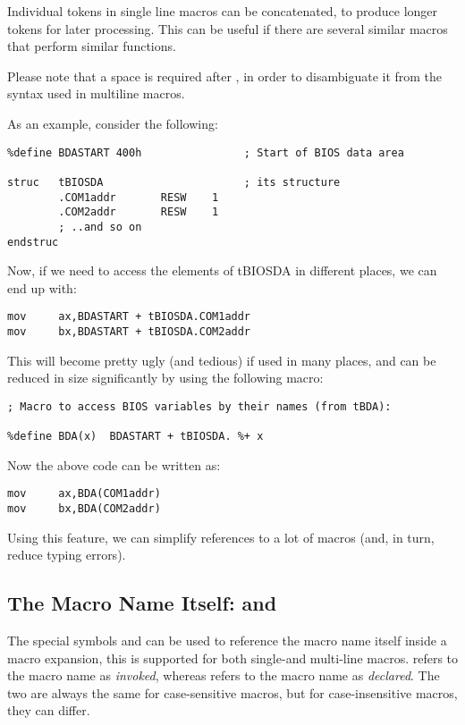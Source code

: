 Individual tokens in single line macros can be concatenated, to produce
longer tokens for later processing. This can be useful if there are
several similar macros that perform similar functions.

Please note that a space is required after \code{\%+}, in order to
disambiguate it from the syntax  used in multiline macros.

As an example, consider the following:

\begin{lstlisting}
%define BDASTART 400h                ; Start of BIOS data area

struc   tBIOSDA                      ; its structure
        .COM1addr       RESW    1
        .COM2addr       RESW    1
        ; ..and so on
endstruc
\end{lstlisting}

Now, if we need to access the elements of tBIOSDA in different places,
we can end up with:

\begin{lstlisting}
mov     ax,BDASTART + tBIOSDA.COM1addr
mov     bx,BDASTART + tBIOSDA.COM2addr
\end{lstlisting}

This will become pretty ugly (and tedious) if used in many places, and
can be reduced in size significantly by using the following macro:

\begin{lstlisting}
; Macro to access BIOS variables by their names (from tBDA):

%define BDA(x)  BDASTART + tBIOSDA. %+ x
\end{lstlisting}

Now the above code can be written as:

\begin{lstlisting}
mov     ax,BDA(COM1addr)
mov     bx,BDA(COM2addr)
\end{lstlisting}

Using this feature, we can simplify references to a lot of macros
(and, in turn, reduce typing errors).

\subsection{The Macro Name Itself:  and }
\label{subsec:selfref}

The special symbols  and  can be used to
reference the macro name itself inside a macro expansion,
this is supported for both single-and multi-line macros.
 refers to the macro name as \emph{invoked}, whereas
 refers to the macro name as \emph{declared}.
The two are always the same for case-sensitive macros, but
for case-insensitive macros, they can differ.

